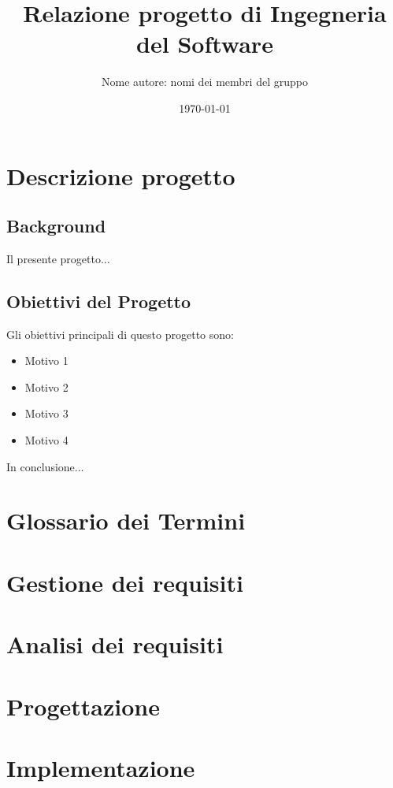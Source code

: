 \documentclass{report}
\title{Relazione progetto di Ingegneria del Software}
\author{Nome autore: nomi dei membri del gruppo}
\date{\today}
\begin{document}
	
	\maketitle
	
	\tableofcontents
	
	\chapter{Descrizione progetto}
	
	\section{Background}
	Il presente progetto...
	
	\section{Obiettivi del Progetto}
	Gli obiettivi principali di questo progetto sono:
	\begin{itemize}
		\item Motivo 1
		\item Motivo 2
		\item Motivo 3
		\item Motivo 4
	\end{itemize}
	
	In conclusione...
	
	\chapter{Glossario dei Termini}
	
	\chapter{Gestione dei requisiti}
	
	\chapter{Analisi dei requisiti}
	
	\chapter{Progettazione}
	
	\chapter{Implementazione}
	
\end{document}
